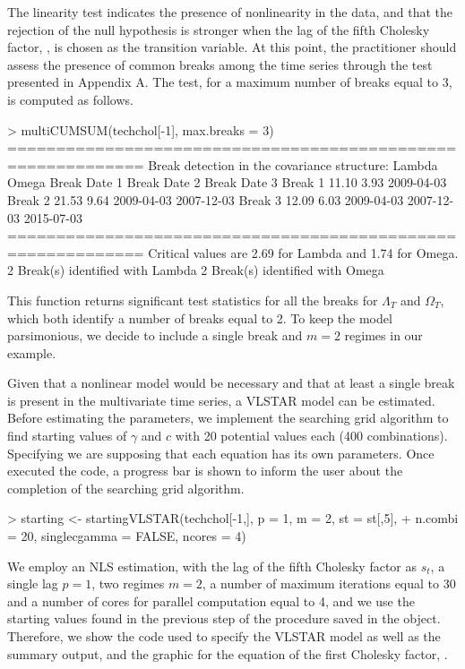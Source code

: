 The linearity test indicates the presence of nonlinearity in the data, and that the rejection of the null hypothesis is stronger when the lag of the fifth Cholesky factor, , is chosen as the transition variable. At this point, the practitioner should assess the presence of common breaks among the time series through the test presented in Appendix A. The test, for a maximum number of breaks equal to 3, is computed as follows.
		
%
\begin{example}
> multiCUMSUM(techchol[-1], max.breaks = 3)
============================================================
Break detection in the covariance structure:
Lambda Omega Break Date 1 Break Date 2 Break Date 3
Break 1  11.10  3.93   2009-04-03                          
Break 2  21.53  9.64   2009-04-03   2007-12-03             
Break 3  12.09  6.03   2009-04-03   2007-12-03   2015-07-03
============================================================
Critical values are 2.69 for Lambda and 1.74 for Omega.
2 Break(s) identified with Lambda 
2 Break(s) identified with Omega
\end{example}
%	
This function returns significant test statistics for all the breaks for $\Lambda_T$ and $\Omega_T$, which both identify a number of breaks equal to 2. To keep the model parsimonious, we decide to include a single break and $m=2$ regimes in our example.
		
Given that a nonlinear model would be necessary and that at least a single break is present in the multivariate time series, a VLSTAR model can be estimated. Before estimating the parameters, we implement the searching grid algorithm to find starting values of $\gamma$ and $c$ with 20 potential values each (400 combinations). Specifying  we are supposing that each equation has its own parameters. Once executed the code, a progress bar is shown to inform the user about the completion of the searching grid algorithm.

%
\begin{example}
>  starting <- startingVLSTAR(techchol[-1,], p = 1, m = 2, st = st[,5], 
+		n.combi = 20, singlecgamma = FALSE, ncores = 4)
\end{example}
%	
We employ an NLS estimation, with the lag of the fifth Cholesky factor as $s_t$, a single lag $p=1$, two regimes $m=2$, a number of maximum iterations equal to 30 and a number of cores for parallel computation equal to 4, and we use the starting values found in the previous step of the procedure saved in the  object. Therefore, we show the code used to specify the VLSTAR model as well as the summary output, and the graphic for the equation of the first Cholesky factor, .

